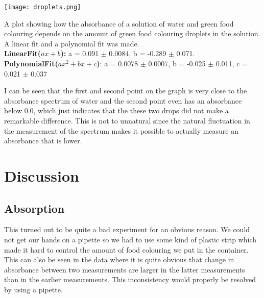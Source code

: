\documentclass[working, oneside]{inputs/tuftebook}
\begin{document}
\begin{marginfigure}
\centering
\texttt{[image: droplets.png]}
\caption{A plot showing how the absorbance of a solution of water and green food colouring depends on the amount of green food colouring droplets in the solution. A linear fit and a polynomial fit was made.\\ 
\textbf{LinearFit($ax+b$):} a = 0.091 $\pm$ 0.0084, b = -0.289 $\pm$ 0.071. \\
\textbf{PolynomialFit($ax^2 + bx +c$)}: a = 0.0078 $\pm$ 0.0007, b = -0.025 $\pm$ 0.011, c = 0.021 $\pm$ 0.037}
\end{marginfigure}
I can be seen that the first and second point on the graph is very close to the absorbance spectrum of water and the second point even has an absorbance below 0.0, which just indicates that the these two drops did not make a remarkable difference. This is not to unnatural since the natural fluctuation in the measurement of the spectrum makes it possible to actually measure an absorbance that is lower.


\section*{Discussion}
\subsection*{Absorption}
This turned out to be quite a bad experiment for an obvious reason. We could not get our hands on a pipette so we had to use some kind of plastic strip which made it hard to control the amount of food colouring we put in the container. This can also be seen in the data where it is quite obvious that change in absorbance between two measurements are larger in the latter measurements than in the earlier measurements. This inconsistency would properly be resolved by using a pipette.  \\
\end{document}
